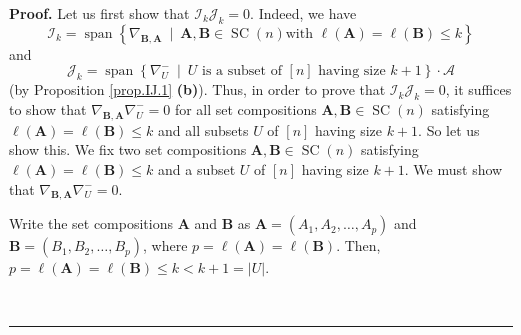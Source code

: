 \documentclass[numbers=enddot,12pt,final,onecolumn,notitlepage]{scrartcl}%
\numberwithin{exer}{subsection}
\theoremstyle{definition}
\newenvironment{proof}[1][Proof]{\noindent\textbf{#1.} }{\ \rule{0.5em}{0.5em}}
\newenvironment{noncompile}{}{}
\begin{document}
\begin{proof}
Let us first show that $\mathcal{I}_{k}\mathcal{J}_{k}=0$. Indeed, we have%
\[
\mathcal{I}_{k}=\operatorname*{span}\left\{  \nabla_{\mathbf{B},\mathbf{A}%
}\ \mid\ \mathbf{A},\mathbf{B}\in\operatorname*{SC}\left(  n\right)  \text{
with }\ell\left(  \mathbf{A}\right)  =\ell\left(  \mathbf{B}\right)  \leq
k\right\}
\]
and%
\[
\mathcal{J}_{k}=\operatorname*{span}\left\{  \nabla_{U}^{-}\ \mid\ U\text{ is
a subset of }\left[  n\right]  \text{ having size }k+1\right\}  \cdot
\mathcal{A}%
\]
(by Proposition \ref{prop.IJ.1} \textbf{(b)}). Thus, in order to prove that
$\mathcal{I}_{k}\mathcal{J}_{k}=0$, it suffices to show that $\nabla
_{\mathbf{B},\mathbf{A}}\nabla_{U}^{-}=0$ for all set compositions
$\mathbf{A},\mathbf{B}\in\operatorname*{SC}\left(  n\right)  $ satisfying
$\ell\left(  \mathbf{A}\right)  =\ell\left(  \mathbf{B}\right)  \leq k$ and
all subsets $U$ of $\left[  n\right]  $ having size $k+1$. So let us show
this. We fix two set compositions $\mathbf{A},\mathbf{B}\in\operatorname*{SC}%
\left(  n\right)  $ satisfying $\ell\left(  \mathbf{A}\right)  =\ell\left(
\mathbf{B}\right)  \leq k$ and a subset $U$ of $\left[  n\right]  $ having
size $k+1$. We must show that $\nabla_{\mathbf{B},\mathbf{A}}\nabla_{U}^{-}=0$.

\begin{noncompile}
Write the set compositions $\mathbf{A}$ and $\mathbf{B}$ as $\mathbf{A}%
=\left(  A_{1},A_{2},\ldots,A_{p}\right)  $ and $\mathbf{B}=\left(
B_{1},B_{2},\ldots,B_{p}\right)  $, where $p=\ell\left(  \mathbf{A}\right)
=\ell\left(  \mathbf{B}\right)  $. Then, $p=\ell\left(  \mathbf{A}\right)
=\ell\left(  \mathbf{B}\right)  \leq k<k+1=\left\vert U\right\vert $.
\end{noncompile}


\end{proof}
\end{document}

